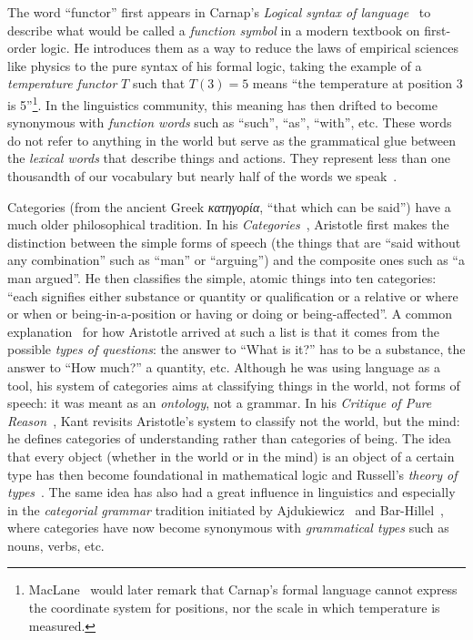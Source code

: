 The word ``functor'' first appears in Carnap's \emph{Logical syntax of language}~\cite{Carnap37} to describe what would be called a \emph{function symbol} in a modern textbook on first-order logic.
He introduces them as a way to reduce the laws of empirical sciences like physics to the pure syntax of his formal logic, taking the example of a \emph{temperature functor} $T$ such that $T(3) = 5$ means ``the temperature at position 3 is 5''\footnote
{MacLane~\cite{MacLane38} would later remark that Carnap's formal language cannot express the coordinate system for positions, nor the scale in which temperature is measured.}.
In the linguistics community, this meaning has then drifted to become synonymous with \emph{function words} such as ``such'', ``as'', ``with'', etc. These words do not refer to anything in the world but serve as the grammatical glue between the \emph{lexical words} that describe things and actions.
They represent less than one thousandth of our vocabulary but nearly half of the words we speak~\cite{ChungPennebaker07}.

Categories (from the ancient Greek \emph{\foreignlanguage{greek}{κατηγορία}}, ``that which can be said'') have a much older philosophical tradition.
In his \emph{Categories}~\cite{Aristotle66}, Aristotle first makes the distinction between the simple forms of speech (the things that are ``said without any combination'' such as ``man'' or ``arguing'') and the composite ones such as ``a man argued''.
He then classifies the simple, atomic things into ten categories: ``each signifies either substance or quantity or qualification or a relative or where or when or being-in-a-position or having or doing or being-affected''.
A common explanation~\cite{Ryle37} for how Aristotle arrived at such a list is that it comes from the possible \emph{types of questions}: the answer to ``What is it?'' has to be a substance, the answer to ``How much?'' a quantity, etc.
Although he was using language as a tool, his system of categories aims at classifying things in the world, not forms of speech: it was meant as an \emph{ontology}, not a grammar.
In his \emph{Critique of Pure Reason}~\cite{Kant81}, Kant revisits Aristotle's system to classify not the world, but the mind: he defines categories of understanding rather than categories of being.
The idea that every object (whether in the world or in the mind) is an object of a certain type has then become foundational in mathematical logic and Russell's \emph{theory of types}~\cite{Russell03}.
The same idea has also had a great influence in linguistics and especially in the \emph{categorial grammar} tradition initiated by Ajdukiewicz~\cite{Ajdukiewicz35} and Bar-Hillel~\cite{Bar-Hillel53,Bar-Hillel54}, where categories have now become synonymous with \emph{grammatical types} such as nouns, verbs, etc.

